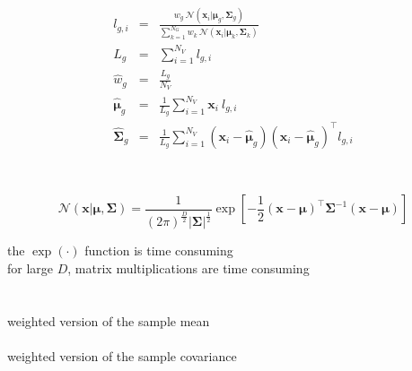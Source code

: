 \documentclass[usenames,dvipsnames]{beamer}
\def\Vec#1{{\boldsymbol{#1}}}
\def\Mat#1{{\boldsymbol{#1}}}
\begin{document}
\begin{frame}
\begin{enumerate}[{~~$\boldsymbol{\bullet}$}]
\begin{minipage}{1\textwidth}
\begin{minipage}{0.45\textwidth}
\centering
%
\begin{eqnarray*}
  l_{g,i}                  & = & \frac{w_g ~ {{\mathcal{N}}}( \Vec{x}_i | \Vec{\mu}_g, \Mat{\Sigma}_g )}{\sum\nolimits_{k=1}^{N_G} w_k ~ {{\mathcal{N}}}( \Vec{x}_i | \Vec{\mu}_k, \Mat{\Sigma}_k )} \\
  L_g                      & = & \sum\nolimits_{i=1}^{N_V} l_{g,i} \\
  \widehat{w}_g            & = & \frac{L_g}{N_V} \\
  \widehat{\Vec{\mu}}_g    & = & \frac{1}{L_g} \sum\nolimits_{i=1}^{N_V} \Vec{x}_i ~ l_{g,i}  \label{eqn:em_mean}  \\
  \widehat{\Mat{\Sigma}}_g & = & \frac{1}{L_g} \sum\nolimits_{i=1}^{N_V} (\Vec{x}_i - \widehat{\Vec{\mu}}_g)(\Vec{x}_i - \widehat{\Vec{\mu}}_g)^\top l_{g,i}
\end{eqnarray*}
\end{minipage}
~
\begin{minipage}{0.45\textwidth}
\begin{tiny}%
\begin{equation*}
  {{\mathcal{N}}}( \Vec{x} | \Vec{\mu}, \Mat{\Sigma} )  = 
  \frac{1}{ (2\pi)^{\frac{D}{2}} | \Mat{\Sigma}|^{\frac{1}{2}} }
  \exp \left[ -\frac{1}{2} (\Vec{x}-\Vec{\mu})^\top \Mat{\Sigma}^{-1} (\Vec{x}-\Vec{\mu}) \right]
\end{equation*}%
\end{tiny}%
the $\exp(\cdot)$ function is time consuming\\
for large $D$, matrix multiplications are time consuming
~\\
~\\
~\\
weighted version of the sample mean\\
~\\
weighted version of the sample covariance\\
~\\
\end{minipage}

\end{minipage}




\end{enumerate}
\end{frame}
\end{document}
